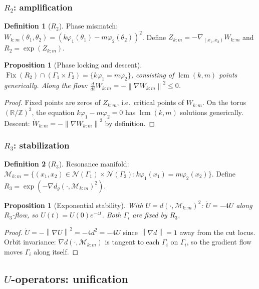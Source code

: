 \documentclass[12pt, oneside]{book}
\theoremstyle{plain}
\newtheorem{proposition}[theorem]{Proposition}
\theoremstyle{definition}
\newtheorem{definition}{Definition}[section]
\theoremstyle{remark}
\newcommand{\R}{\mathbb{R}}
\newcommand{\Orb}{\Gamma}
\newcommand{\cN}{\mathcal{N}}
\newcommand{\cM}{\mathcal{M}}
\newcommand{\dg}{d_g}
\newcommand{\norm}[1]{\left\|#1\right\|}
\DeclareMathOperator{\lcm}{lcm}
\DeclareMathOperator{\Fix}{Fix}
\begin{document}
\subsubsection{\texorpdfstring{$R_2$}{R2}: amplification}

\begin{definition}[$R_2$]\label{def:R2}
Phase mismatch:
$W_{k:m}(\theta_1,\theta_2)=(k\varphi_1(\theta_1)-m\varphi_2(\theta_2))^2$.
Define $Z_{k:m}=-\nabla_{(x_1,x_2)}W_{k:m}$ and
$R_2=\exp(Z_{k:m})$.
\end{definition}

\begin{proposition}[Phase locking and descent]\label{prop:R2}
$\Fix(R_2)\cap(\Orb_1\times\Orb_2)=\{k\varphi_1=m\varphi_2\}$,
consisting of $\lcm(k,m)$ points generically.
Along the flow: $\tfrac{d}{dt}W_{k:m}=-\norm{\nabla W_{k:m}}^2\le 0$.
\end{proposition}
\begin{proof}
Fixed points are zeros of $Z_{k:m}$, i.e.\ critical points of
$W_{k:m}$. On the torus $(\R/\mathbb{Z})^2$, the equation
$k\varphi_1-m\varphi_2=0$ has $\lcm(k,m)$ solutions generically.
Descent: $\dot W_{k:m}=-\norm{\nabla W_{k:m}}^2$ by definition.
\end{proof}

\subsubsection{\texorpdfstring{$R_3$}{R3}: stabilization}

\begin{definition}[$R_3$]\label{def:R3}
Resonance manifold:
$\cM_{k:m}=\{(x_1,x_2)\in\cN(\Orb_1)\times\cN(\Orb_2):
k\varphi_1(x_1)=m\varphi_2(x_2)\}$.
Define $R_3=\exp(-\nabla\dg(\cdot,\cM_{k:m})^2)$.
\end{definition}

\begin{proposition}[Exponential stability]\label{prop:R3}
With $U=d(\cdot,\cM_{k:m})^2$: $\dot U=-4U$ along $R_3$-flow,
so $U(t)=U(0)e^{-4t}$.
Both $\Orb_i$ are fixed by $R_3$.
\end{proposition}
\begin{proof}
$\dot U=-\norm{\nabla U}^2=-4d^2=−4U$ since $\norm{\nabla d}=1$
away from the cut locus. Orbit invariance: $\nabla d(\cdot,\cM_{k:m})$
is tangent to each $\Orb_i$ on $\Orb_i$, so the gradient flow moves
$\Orb_i$ along itself.
\end{proof}

\subsection{\texorpdfstring{$U$}{U}-operators: unification}
\label{subsec:U}
\end{document}
